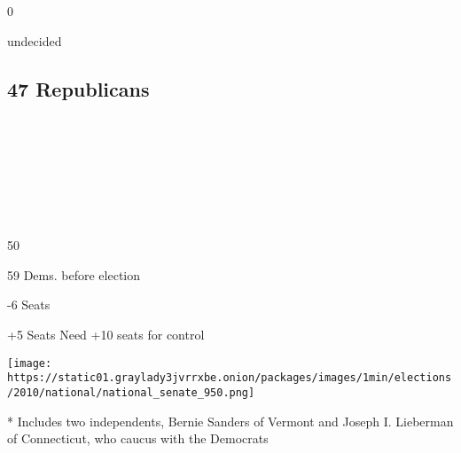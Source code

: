 \subsection{}

0

undecided

\hypertarget{47-republicans}{%
\subsection{47 Republicans}\label{47-republicans}}

~

~

~

~

50

59 Dems. before election

-6 Seats

+5 Seats Need +10 seats for control

\texttt{[image: https://static01.graylady3jvrrxbe.onion/packages/images/1min/elections/2010/national/national\_senate\_950.png]}

* Includes two independents, Bernie Sanders of Vermont and Joseph I.
Lieberman of Connecticut, who caucus with the Democrats

